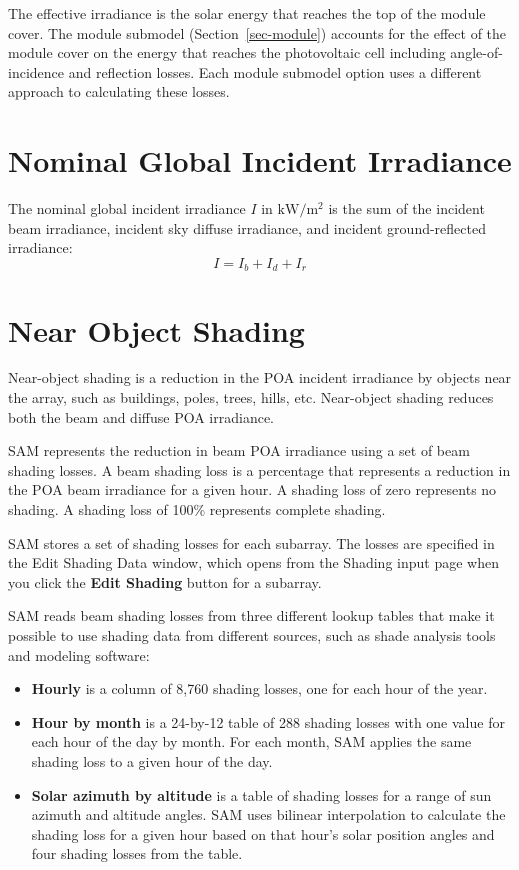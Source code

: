 \documentclass[12pt,letterpaper]{article}
\begin{document}
The effective irradiance is the solar energy that reaches the top of the module cover. The module submodel (Section~\ref{sec-module}) accounts for the effect of the module cover on the energy that reaches the photovoltaic cell including angle-of-incidence and reflection losses. Each module submodel option uses a different approach to calculating these losses.

\section{Nominal Global Incident Irradiance}\label{sec-nominalincidentirradiance}

The nominal global incident irradiance $I$ in $\mathrm{kW/m^2}$ is the sum of the incident beam irradiance, incident sky diffuse irradiance, and incident ground-reflected irradiance:
\begin{equation}
I = I_{b} + I_{d} + I_{r}
\end{equation}

\section{Near Object Shading}\label{sec-nearobjectshad}

Near-object shading is a reduction in the POA incident irradiance by objects near the array, such as buildings, poles, trees, hills, etc. Near-object shading reduces both the beam and diffuse POA irradiance.

SAM represents the reduction in beam POA irradiance using a set of beam shading losses. A beam shading loss is a percentage that represents a reduction in the POA beam irradiance for a given hour. A shading loss of zero represents no shading. A shading loss of 100\% represents complete shading.

SAM stores a set of shading losses for each subarray. The losses are specified in the Edit Shading Data window, which opens from the Shading input page when you click the \textbf{Edit Shading} button for a subarray.

SAM reads beam shading losses from three different lookup tables that make it possible to use shading data from different sources, such as shade analysis tools and modeling software:
\begin{itemize} 
\item \textbf{Hourly} is a column of 8,760 shading losses, one for each hour of the year.
\item \textbf{Hour by month} is a 24-by-12 table of 288 shading losses with one value for each hour of the day by month. For each month, SAM applies the same shading loss to a given hour of the day.
\item \textbf{Solar azimuth by altitude} is a table of shading losses for a range of sun azimuth and altitude angles. SAM uses bilinear interpolation to calculate the shading loss for a given hour based on that hour's solar position angles and four shading losses from the table.
\end{itemize}
\end{document}
